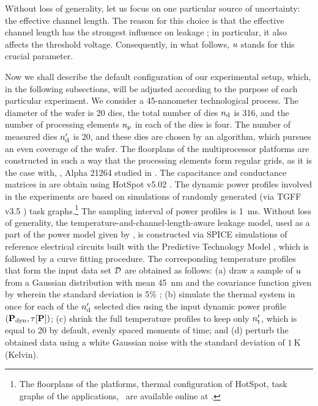 
Without loss of generality, let us focus on one particular source of uncertainty: the effective channel length.
The reason for this choice is that the effective channel length has the strongest influence on leakage \cite{chandrakasan2001, srivastava2010, juan2011, juan2012}; in particular, it also affects the threshold voltage. Consequently, in what follows, $u$ stands for this crucial parameter.

Now we shall describe the default configuration of our experimental setup, which, in the following subsections, will be adjusted according to the purpose of each particular experiment.
We consider a 45-nanometer technological process. The diameter of the wafer is 20 dies, the total number of dies ${n_\text{d}}$ is 316, and the number of processing elements ${n_\text{p}}$ in each of the dies is four.
The number of measured dies ${n_\text{d}'}$ is 20, and these dies are chosen by an algorithm, which pursues an even coverage of the wafer.
The floorplans of the multiprocessor platforms are constructed in such a way that the processing elements form regular grids, as it is the case with, \eg, Alpha 21264 studied in \cite{juan2011}. The capacitance and conductance matrices in  are obtain using HotSpot v5.02 \cite{hotspot}.
The dynamic power profiles involved in the experiments are based on simulations of randomly generated (via TGFF v3.5 \cite{dick1998}) task graphs.\footnote{The floorplans of the platforms, thermal configuration of HotSpot, task graphs of the applications, \etc\ are available online at \cite{sources}.} The sampling interval of power profiles is 1~ms.
Without loss of generality, the temperature-and-channel-length-aware leakage model, used as a part of the power model given by , is constructed via SPICE simulations of reference electrical circuits built with the Predictive Technology Model \cite{ptm}, which is followed by a curve fitting procedure.
The corresponding temperature profiles that form the input data set $\mathcal{D}$ are obtained as follows: (a) draw a sample of $u$ from a Gaussian distribution with mean 45~nm and the covariance function given by  wherein the standard deviation is 5\% \cite{juan2011, juan2012}; (b) simulate the thermal system in  once for each of the ${n_\text{d}'}$ selected dies using the input dynamic power profile $(\mathbf{P}_{\text{dyn}}, \tau[\mathbf{P}])$; (c) shrink the full temperature profiles to keep only ${n_\text{t}'}$, which is equal to 20 by default, evenly spaced moments of time; and (d) perturb the obtained data using a white Gaussian noise with the standard deviation of $1~\text{K}$ (Kelvin).

